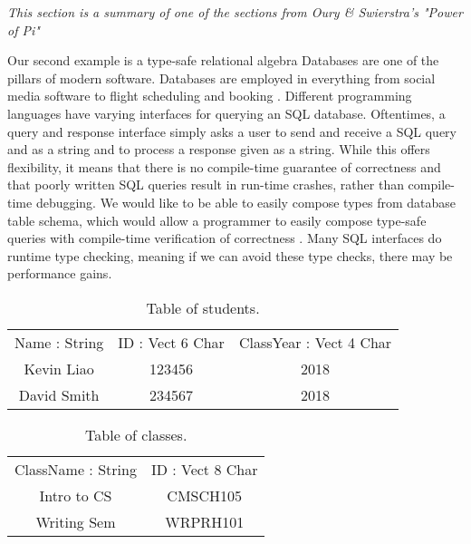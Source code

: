 \textit{This section is a summary of one of the sections from Oury & Swierstra's
"Power of Pi" \cite{power_of_pi}}

Our second example is a type-safe relational algebra Databases are one of the
pillars of modern software. Databases are employed in everything from social
media software \cite{tao} to flight scheduling and booking \cite{flights}.
Different programming languages have varying interfaces for querying an SQL
database. Oftentimes, a query and response interface simply asks a user to send
and receive a SQL query and as a string and to process a response given as a
string. While this offers flexibility, it means that there is no compile-time
guarantee of correctness and that poorly written SQL queries result in run-time
crashes, rather than compile-time debugging. We would like to be able to easily
compose types from database table schema, which would allow a programmer to
easily compose type-safe queries with compile-time verification of correctness
\cite{power_of_pi}. Many SQL interfaces do runtime type checking, meaning if we
can avoid these type checks, there may be performance gains. 

\begin{table}[h]
    \centering
    \begin{tabular}{|c|c|c|}
        Name : String & ID : Vect 6 Char & ClassYear : Vect 4 Char \\
        Kevin Liao    & 123456           & 2018                    \\
        David Smith   & 234567           & 2018
    \end{tabular}
    \caption{Table of students.}
    \label{students}
\end{table}

\begin{table}[h]
    \centering
    \begin{tabular}{|c|c|}
        ClassName : String & ID : Vect 8 Char\\
        Intro to CS        & CMSCH105        \\
        Writing Sem        & WRPRH101
    \end{tabular}
    \caption{Table of classes.}
    \label{classes}
\end{table}

